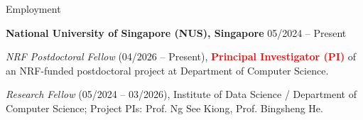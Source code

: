 \begin{rSection}{Employment}
  {\small
    {\bf National University of Singapore (NUS), Singapore} \hfill {05/2024 -- Present}
    \vspace{-0.5em}
    \begin{list}{\textbullet}{\setlength{\leftmargin}{1.5em}\setlength{\labelwidth}{0.8em}\setlength{\labelsep}{0.4em}\setlength{\itemsep}{0.4em}\setlength{\parsep}{0pt}\setlength{\topsep}{0pt}\setlength{\partopsep}{0pt}}
      \item {\em NRF Postdoctoral Fellow} (04/2026 -- Present), \textcolor{red}{\textbf{Principal Investigator (PI)}} of an NRF-funded postdoctoral project at Department of Computer Science.
      \item {\em Research Fellow} (05/2024 -- 03/2026), Institute of Data Science / Department of Computer Science; Project PIs: Prof. Ng See Kiong, Prof. Bingsheng He.
    \end{list}
  }
\end{rSection}

